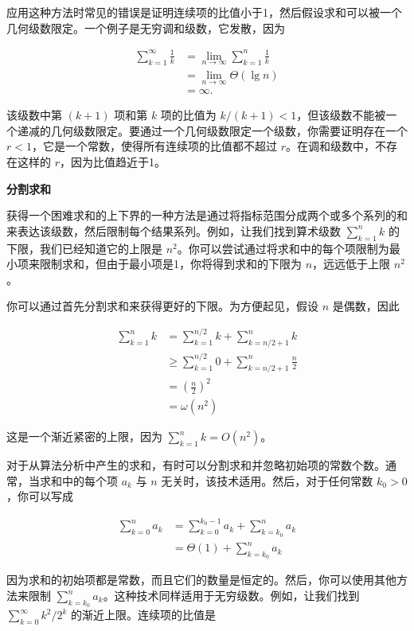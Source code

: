 \documentclass[lang=cn,newtx,10pt,scheme=chinese]{elegantbook}
\begin{document}
应用这种方法时常见的错误是证明连续项的比值小于1，然后假设求和可以被一个几何级数限定。一个例子是无穷调和级数，它发散，因为

$$
\begin{aligned}
\sum_{k=1}^{\infty} \frac{1}{k} & =\lim _{n \rightarrow \infty} \sum_{k=1}^n \frac{1}{k} \\
& =\lim _{n \rightarrow \infty} \Theta(\lg n) \\
& =\infty .
\end{aligned}
$$

该级数中第 $(k+1)$ 项和第 $k$ 项的比值为 $k /(k+1)<1$，但该级数不能被一个递减的几何级数限定。要通过一个几何级数限定一个级数，你需要证明存在一个 $r<1$，它是一个常数，使得所有连续项的比值都不超过 $r$。在调和级数中，不存在这样的 $r$，因为比值趋近于1。

\textbf{分割求和}

获得一个困难求和的上下界的一种方法是通过将指标范围分成两个或多个系列的和来表达该级数，然后限制每个结果系列。例如，让我们找到算术级数 $\sum_{k=1}^n k$ 的下限，我们已经知道它的上限是 $n^2$。你可以尝试通过将求和中的每个项限制为最小项来限制求和，但由于最小项是1，你将得到求和的下限为 $n$，远远低于上限 $n^2$。

你可以通过首先分割求和来获得更好的下限。为方便起见，假设 $n$ 是偶数，因此

$$
\begin{aligned}
\sum_{k=1}^n k & =\sum_{k=1}^{n / 2} k+\sum_{k=n / 2+1}^n k \\
& \geq \sum_{k=1}^{n / 2} 0+\sum_{k=n / 2+1}^n \frac{n}{2} \\
& =(\frac{n}{2})^2 \\
& =\omega(n^2)
\end{aligned}
$$

这是一个渐近紧密的上限，因为 $\sum_{k=1}^n k=O(n^2)$。

对于从算法分析中产生的求和，有时可以分割求和并忽略初始项的常数个数。通常，当求和中的每个项 $a_k$ 与 $n$ 无关时，该技术适用。然后，对于任何常数 $k_0>0$，你可以写成

$$
\begin{aligned}
\sum_{k=0}^n a_k & =\sum_{k=0}^{k_0-1} a_k+\sum_{k=k_0}^n a_k \\
& =\Theta(1)+\sum_{k=k_0}^n a_k
\end{aligned}
$$

因为求和的初始项都是常数，而且它们的数量是恒定的。然后，你可以使用其他方法来限制 $\sum_{k=k_0}^n a_k$。这种技术同样适用于无穷级数。例如，让我们找到 $\sum_{k=0}^{\infty} k^2 / 2^k$ 的渐近上限。连续项的比值是
\end{document}
